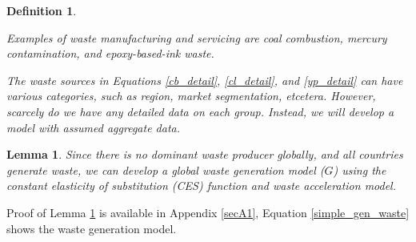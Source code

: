 \documentclass[sn-basic]{sn-jnl}%
\theoremstyle{thmstyleone}%
\newtheorem{lemma}[theorem]{Lemma}
\theoremstyle{thmstyletwo}%
\theoremstyle{thmstylethree}%
\newtheorem{definition}{Definition}%
\begin{document}
\begin{definition}
\begin{enumerate}
			Examples of waste manufacturing and servicing are coal combustion, mercury contamination, and epoxy-based-ink waste. 
	\end{enumerate}
	The waste sources in Equations \ref{cb_detail}, \ref{cl_detail}, and \ref{yp_detail} can have various categories, such as region, market segmentation, etcetera.
	However, scarcely do we have any detailed data on each group. Instead, we will develop a model with assumed aggregate data.
\end{definition}

\begin{lemma}
	\label{lemma1}
	Since there is no dominant waste producer globally, and all countries generate waste, we can develop a global waste generation model ($G$) using the constant elasticity of substitution (CES) function and waste acceleration model.
\end{lemma}

Proof of Lemma \ref{lemma1} is available in Appendix \ref{secA1}, Equation \ref{simple_gen_waste} shows the waste generation model.
\end{document}
